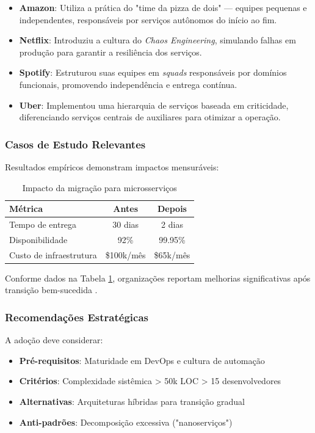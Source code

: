 \begin{itemize}
    \item \textbf{Amazon}: Utiliza a prática do "time da pizza de dois" — equipes pequenas e independentes, responsáveis por serviços autônomos do início ao fim.
    
    \item \textbf{Netflix}: Introduziu a cultura do \textit{Chaos Engineering}, simulando falhas em produção para garantir a resiliência dos serviços.

    \item \textbf{Spotify}: Estruturou suas equipes em \textit{squads} responsáveis por domínios funcionais, promovendo independência e entrega contínua.

    \item \textbf{Uber}: Implementou uma hierarquia de serviços baseada em criticidade, diferenciando serviços centrais de auxiliares para otimizar a operação.
\end{itemize}

\subsubsection{Casos de Estudo Relevantes}
Resultados empíricos demonstram impactos mensuráveis:

\begin{table}[h]
\centering
\caption{Impacto da migração para microsserviços}
\begin{tabular}{|l|c|c|}
\hline
\textbf{Métrica} & \textbf{Antes} & \textbf{Depois} \\
\hline
Tempo de entrega & 30 dias & 2 dias \\
Disponibilidade & 92\% & 99.95\% \\
Custo de infraestrutura & \$100k/mês & \$65k/mês \\
\hline
\end{tabular}
\label{tab:impacto}
\end{table}

Conforme dados na Tabela \ref{tab:impacto}, organizações reportam melhorias significativas após transição bem-sucedida \cite{farhan2023performance, shekhar2023microservices}.

\subsubsection{Recomendações Estratégicas}
A adoção deve considerar:

\begin{itemize}
    \item \textbf{Pré-requisitos}: Maturidade em DevOps e cultura de automação
    \item \textbf{Critérios}: Complexidade sistêmica > 50k LOC > 15 desenvolvedores
    \item \textbf{Alternativas}: Arquiteturas híbridas para transição gradual
    \item \textbf{Anti-padrões}: Decomposição excessiva ("nanoserviços")
\end{itemize}

